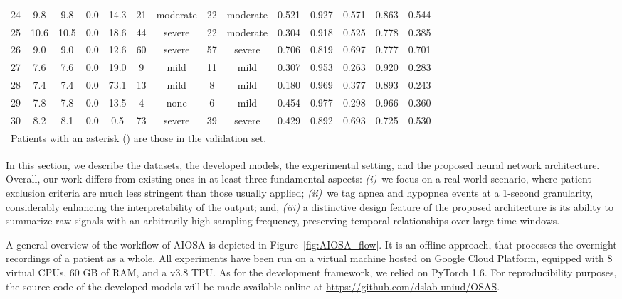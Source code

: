 \documentclass[5p,twocolumn,lefttitle]{elsarticle}
\begin{document}
\begin{table*}[tb]
{\begin{tabular}{c|cccccc|ccccccc}
24     & 9.8  & 9.8 & 0.0 & 14.3 & 21 & moderate & 22 & moderate & 0.521 & 0.927 & 0.571 & 0.863 & 0.544 \\
25     & 10.6 & 10.5 & 0.0 & 18.6 & 44 & severe   & 22 & moderate & 0.304 & 0.918 & 0.525 & 0.778 & 0.385 \\
26     & 9.0  & 9.0 & 0.0 & 12.6 & 60 & severe   & 57 & severe   & 0.706 & 0.819 & 0.697 & 0.777 & 0.701 \\
27     & 7.6  & 7.6 & 0.0 & 19.0 & 9  & mild     & 11 & mild     & 0.307 & 0.953 & 0.263 & 0.920 & 0.283 \\
28     & 7.4  & 7.4 & 0.0 & 73.1 & 13 & mild     & 8  & mild     & 0.180 & 0.969 & 0.377 & 0.893 & 0.243 \\
29     & 7.8  & 7.8 & 0.0 & 13.5 & 4  & none     & 6  & mild     & 0.454 & 0.977 & 0.298 & 0.966 & 0.360 \\
30     & 8.2  & 8.1 & 0.0 & 0.5 & 73 & severe   & 39 & severe   & 0.429 & 0.892 & 0.693 & 0.725 & 0.530 \\
\bottomrule
\multicolumn{13}{l}{\small Patients with an asterisk () are those in the validation set.}
\end{tabular}
}
\end{table*}

In this section, we describe the datasets, the developed models,  the experimental setting, and the proposed neural network architecture. 
Overall, our work differs from existing ones in at least three fundamental aspects: \emph{(i)}~we focus on a real-world scenario, where patient exclusion criteria are much less stringent than those usually applied; \emph{(ii)}~we tag apnea and hypopnea events at a 1-second granularity, considerably enhancing the interpretability of the output; and, \emph{(iii)} a distinctive design feature of the proposed architecture is its ability to summarize raw signals with an arbitrarily high sampling frequency, preserving temporal relationships over large time windows. 

A general overview of the workflow of AIOSA is depicted in Figure~\ref{fig:AIOSA_flow}. It is an offline approach, that processes the overnight recordings of a patient as a whole. All experiments have been run on a virtual machine hosted on Google Cloud Platform, equipped with 8 virtual CPUs, 60 GB of RAM, and a v3.8 TPU. As for the development framework, we relied on PyTorch 1.6. For reproducibility purposes, the source code of the developed models will be made available online at \url{https://github.com/dslab-uniud/OSAS}.
\end{document}
